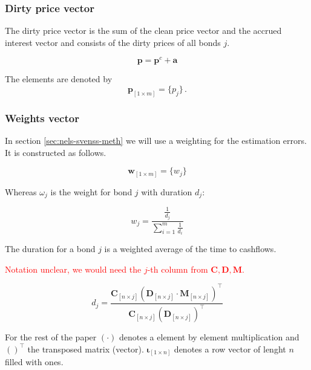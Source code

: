 \subsubsection*{Dirty price vector}

The dirty price vector is the sum of the clean price vector and the accrued interest vector and consists of the dirty prices of all bonds $j$.

\begin{displaymath}
\bm{p}=\bm{p}^c+\bm{a}
\end{displaymath}

The elements are denoted by 
\begin{equation}\label{pd}
    \bm{p}_{\left[1\times m\right]}= \{p_j\}\,.
\end{equation}


\subsubsection*{Weights vector}

In section \ref{sec:nels-svenss-meth} we will use a weighting for the estimation errors. It is constructed  as follows.

\begin{equation}\label{weights}
    \bm{w}_{\left[1\times m\right]}= \{w_j\}
\end{equation}

Whereas $\omega_j$ is the weight for bond $j$ with duration $d_j$:

\begin{displaymath}
    w_j=\frac{\frac{1}{d_j}}{\sum_{i=1}^m\frac{1}{d_i}}
\end{displaymath}


The duration for a bond $j$ is a weighted average of the time to cashflows.

\textcolor{red}{Notation unclear, we would need the $j$-th column from $\bm{C,D,M}$.}

\begin{equation}\label{duration}
d_j= \frac{\bm{C}_{\left[n \times j\right]} \left(\bm{D}_{\left[n\times j\right]} \cdot \bm{M}_{\left[n\times j\right]}\right)^{\top}} {\bm{C}_{\left[n \times j\right]}\left(\bm{D}_{\left[n\times j\right]}\right)^{\top}}
\end{equation}



For the rest of the paper $(\cdot)$ denotes a element by element multiplication and $( )^{\top}$ the transposed matrix (vector). $\bm{\iota}_{\left[1\times n\right]}$ denotes a row vector of lenght $n$ filled with ones.


